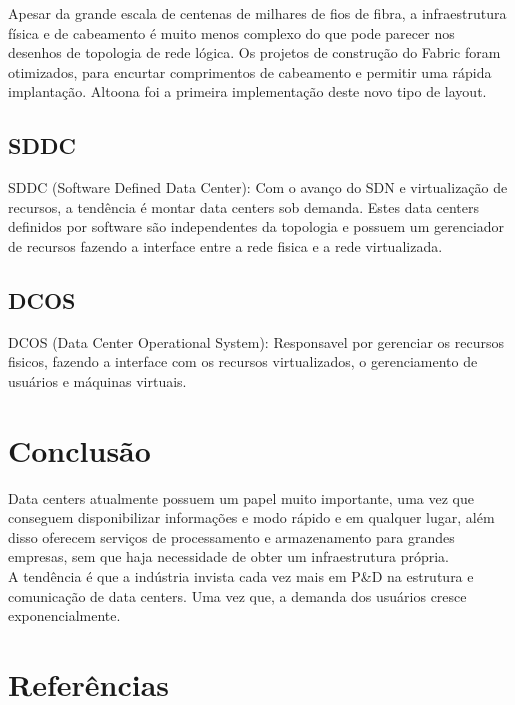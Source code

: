\documentclass[12pt,a4paper]{report}
\begin{document}
Apesar da grande escala de centenas de milhares de fios de fibra, a infraestrutura física 
e de cabeamento é muito menos complexo do que pode parecer nos desenhos de topologia de rede lógica. 
Os projetos de construção do Fabric foram otimizados, para encurtar comprimentos de cabeamento 
e permitir uma rápida implantação. Altoona foi a primeira implementação deste novo tipo de layout.\\

\section{SDDC}

SDDC (Software Defined Data Center): Com o avanço do SDN e virtualização de recursos, a
tendência é montar data centers sob demanda. Estes data centers definidos por software são
independentes da topologia e possuem um gerenciador de recursos fazendo a interface entre a
rede fisica e a rede virtualizada.\\

\section{DCOS}

DCOS (Data Center Operational System): Responsavel por gerenciar os recursos fisicos,
fazendo a interface com os recursos virtualizados, o gerenciamento de usuários e máquinas
virtuais.\\

\chapter{Conclusão}

Data centers atualmente possuem um papel muito importante, uma vez que conseguem disponibilizar informações e modo rápido e em qualquer lugar, além disso oferecem serviços de processamento e armazenamento para grandes empresas, sem que haja necessidade de obter um infraestrutura própria.\\

A tendência é que a indústria invista cada vez mais em P&D na estrutura e comunicação de data centers. Uma vez que, a demanda dos usuários cresce exponencialmente.\\

\chapter{Referências}
\end{document}
